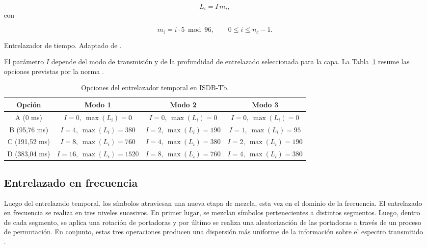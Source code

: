 \begin{equation}
L_i = I\,m_i,
\end{equation}
con

\begin{equation}
m_i = i\cdot 5 \bmod 96, \qquad 0\leq i \leq n_c-1.
\end{equation}

{Entrelazador de tiempo.}
{Adaptado de \cite{abnt}.}
{\label{fig:time_intrl_seccion}}

El parámetro $I$ depende del modo de transmisión y de la profundidad de entrelazado seleccionada para la capa. La Tabla~\ref{tab:isdbtb_interc_tiempo} resume las opciones previstas por la norma \cite{portugues}.

{
\begin{table}[H]
\renewcommand{\arraystretch}{1.3}
\centering
\caption{Opciones del entrelazador temporal en ISDB-Tb.}
\label{tab:isdbtb_interc_tiempo}
\begin{tabular}{|c|c|c|c|}
\hline
Opción & Modo 1 & Modo 2 & Modo 3 \\
\hline
A (0 ms) & $I=0,\ \max(L_i)=0$ & $I=0,\ \max(L_i)=0$ & $I=0,\ \max(L_i)=0$ \\\hline
B (95,76 ms) & $I=4,\ \max(L_i)=380$ & $I=2,\ \max(L_i)=190$ & $I=1,\ \max(L_i)=95$ \\\hline
C (191,52 ms) & $I=8,\ \max(L_i)=760$ & $I=4,\ \max(L_i)=380$ & $I=2,\ \max(L_i)=190$ \\\hline
D (383,04 ms) & $I=16,\ \max(L_i)=1520$ & $I=8,\ \max(L_i)=760$ & $I=4,\ \max(L_i)=380$ \\
\hline
\end{tabular}
\end{table}
}



\subsection{Entrelazado en frecuencia}

Luego del entrelazado temporal, los símbolos atraviesan una nueva etapa de mezcla, esta vez en el dominio de la frecuencia. El entrelazado en frecuencia se realiza en tres niveles sucesivos. En primer lugar, se mezclan símbolos pertenecientes a distintos segmentos. Luego, dentro de cada segmento, se aplica una rotación de portadoras y por último se realiza una aleatorización de las portadoras a través de un proceso de permutación. En conjunto, estas tres operaciones producen una dispersión más uniforme de la información sobre el espectro transmitido \cite{portugues}.


